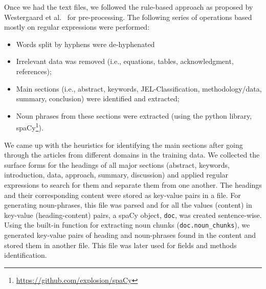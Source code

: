 \documentclass[runningheads]{llncs}
\begin{document}
	\smallskip
	
	Once we had the text files, we followed the rule-based approach as proposed by Westergaard et al.~\cite{DBLP:journals/ploscb/WestergaardSTJB18} for pre-processing. The following series of operations based mostly on regular expressions were performed:
	\begin{itemize}
		\item Words split by hyphens were de-hyphenated %
		\item Irrelevant data was removed (i.e., equations, tables, acknowledgment, references);
		\item \raggedright Main sections (i.e., abstract, keywords,
		JEL-Classification, methodology/data, summary, conclusion) were identified and extracted;
		\item Noun phrases from these sections were extracted (using the python library, spaCy\footnote{\url{https://github.com/explosion/spaCy}}).
	\end{itemize}
	
	We came up with the heuristics for identifying the main sections after going through the articles from different domains in the training data. We collected the surface forms for the headings of all major sections (abstract, keywords, introduction, data, approach, summary, discussion) and applied regular expressions to search for them and separate them from one another. The headings and their corresponding content were stored as key-value pairs in a file. %
	For generating noun-phrases, this file was parsed and for all the values (content) in key-value (heading-content) pairs, a spaCy object, \texttt{doc}, was created sentence-wise. Using the built-in function for extracting noun chunks ({\texttt{doc.noun\_chunks}}), we generated key-value pairs of heading and noun-phrases found in the content and stored them in another file. This file was later used for fields and methods identification.
	
\end{document}
